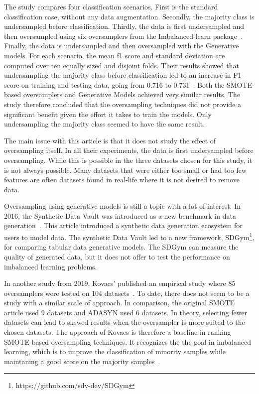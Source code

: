 The study compares four classification scenarios. First is the standard classification case, without any data augmentation. Secondly, the majority class is undersampled before classification. Thirdly, the data is first undersampled and then oversampled using six oversamplers from the Imbalanced-learn package~\cite{Lemaitre2017Imbalanced-learn:Learning}. Finally, the data is undersampled and then oversampled with the Generative models. For each scenario, the mean f1 score and standard deviation are computed over ten equally sized and disjoint folds. Their results showed that undersampling the majority class before classification led to an increase in F1-score on training and testing data, going from 0.716 to 0.731~\cite{Camino2020OversamplingEffort}. Both the SMOTE-based oversamplers and Generative Models achieved very similar results. The study therefore concluded that the oversampling techniques did not provide a significant benefit given the effort it takes to train the models. Only undersampling the majority class seemed to have the same result.

The main issue with this article is that it does not study the effect of oversampling itself. In all their experiments, the data is first undersampled before oversampling. While this is possible in the three datasets chosen for this study, it is not always possible. Many datasets that were either too small or had too few features are often datasets found in real-life where it is not desired to remove data. 

Oversampling using generative models is still a topic with a lot of interest. In 2016, the Synthetic Data Vault was introduced as a new benchmark in data generation~\cite{Patki2016TheVault}. This article introduced a synthetic data generation ecosystem for users to model data. The synthetic Data Vault led to a new framework, SDGym\footnote{https://github.com/sdv-dev/SDGym}, for comparing tabular data generative models. The SDGym can measure the quality of generated data, but it does not offer to test the performance on imbalanced learning problems.

In another study from 2019, Kovacs' published an empirical study where 85 oversamplers were tested on 104 datasets~\cite{Kovacs2019AnDatasets}. To date, there does not seem to be a study with a similar scale of approach. In comparison, the original SMOTE article used 9 datasets and ADASYN used 6 datasets. In theory, selecting fewer datasets can lead to skewed results when the oversampler is more suited to the chosen datasets. The approach of Kovacs is therefore a baseline in ranking SMOTE-based oversampling techniques. It recognizes the the goal in imbalanced learning, which is to improve the classification of minority samples while maintaning a good score on the majority samples~\cite{Fernandez2018LearningSets}. 


